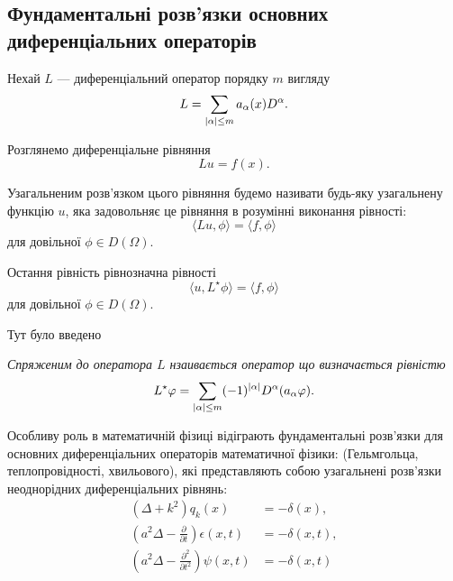 % 


% 

% 



\subsection{Фундаментальні розв'язки основних диференціальних операторів}

Нехай $L$ --- диференціальний оператор порядку $m$ вигляду
\begin{equation}
	L = \displaystyle\sum\limits_{|\alpha|\le m}a_\alpha(x)D^\alpha.
\end{equation}

Розглянемо диференціальне рівняння
\begin{equation}
	L u = f(x).
\end{equation}

\begin{definition}
	Узагальненим розв'язком цього рівняння будемо називати будь-яку узагальнену функцію $u$, яка задовольняє це рівняння в розумінні виконання рівності:
	\begin{equation}
		\langle L u, \phi \rangle = \langle f, \phi \rangle
	\end{equation}
	для довільної $\phi \in D(\Omega)$.
\end{definition}

Остання рівність рівнозначна рівності
\begin{equation}
	\langle u, L^\star \phi \rangle = \langle f, \phi \rangle
\end{equation}
для довільної $\phi \in D(\Omega)$. \medskip

Тут було введено
\begin{definition}
	\it{Спряженим} до оператора $L$ нзаивається оператор що визначається рівністю
	\begin{equation}
		L^\star \varphi = \displaystyle\sum\limits_{|\alpha|\le m} (-1)^{|\alpha|} D^\alpha (a_\alpha \varphi).
	\end{equation}
\end{definition}

Особливу роль в математичній фізиці відіграють фундаментальні роз\-в'яз\-ки для основних диференціальних операторів математичної фізики: (Гельмгольца, теплопровідності, хвильового), які представляють собою узагальнені розв'язки неоднорідних диференціальних рівнянь:
\begin{align}
	(\Delta + k^2) q_k(x) &= - \delta(x), \\
	\left( a^2 \Delta - \frac{\partial}{\partial t} \right) \epsilon(x, t) &= - \delta(x, t), \\
	\left( a^2 \Delta - \frac{\partial^2}{\partial t^2} \right) \psi(x, t) &= - \delta(x, t)
\end{align}

